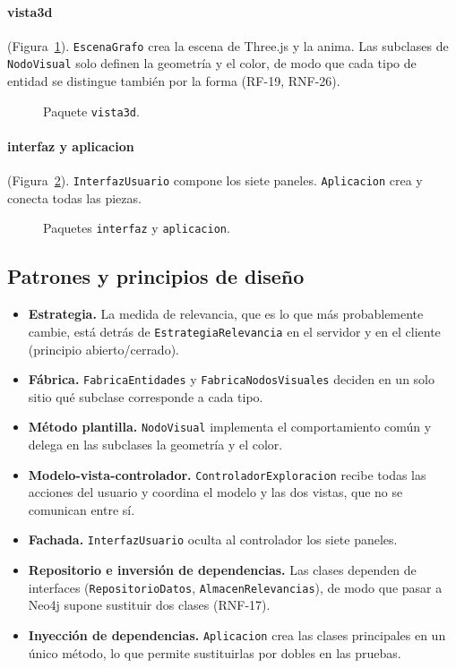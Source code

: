 \paragraph{vista3d} (Figura~\ref{fig:clases-vista3d}). \texttt{EscenaGrafo} crea la escena de Three.js y la anima. Las subclases de \texttt{NodoVisual} solo definen la geometría y el color, de modo que cada tipo de entidad se distingue también por la forma (RF-19, RNF-26).

\begin{figure}[htbp]
  \centering
  \caption{Paquete \texttt{vista3d}.}
  \label{fig:clases-vista3d}
\end{figure}

\paragraph{interfaz y aplicacion} (Figura~\ref{fig:clases-interfaz}). \texttt{InterfazUsuario} compone los siete paneles. \texttt{Aplicacion} crea y conecta todas las piezas.

\begin{figure}[htbp]
  \centering
  \caption{Paquetes \texttt{interfaz} y \texttt{aplicacion}.}
  \label{fig:clases-interfaz}
\end{figure}

\subsection{Patrones y principios de diseño}
\label{sec:patrones}

\begin{itemize}
  \item \textbf{Estrategia.} La medida de relevancia, que es lo que más probablemente cambie, está detrás de \texttt{EstrategiaRelevancia} en el servidor y en el cliente (principio abierto/cerrado).
  \item \textbf{Fábrica.} \texttt{FabricaEntidades} y \texttt{FabricaNodosVisuales} deciden en un solo sitio qué subclase corresponde a cada tipo.
  \item \textbf{Método plantilla.} \texttt{NodoVisual} implementa el comportamiento común y delega en las subclases la geometría y el color.
  \item \textbf{Modelo-vista-controlador.} \texttt{ControladorExploracion} recibe todas las acciones del usuario y coordina el modelo y las dos vistas, que no se comunican entre sí.
  \item \textbf{Fachada.} \texttt{InterfazUsuario} oculta al controlador los siete paneles.
  \item \textbf{Repositorio e inversión de dependencias.} Las clases dependen de interfaces (\texttt{RepositorioDatos}, \texttt{AlmacenRelevancias}), de modo que pasar a Neo4j supone sustituir dos clases (RNF-17).
  \item \textbf{Inyección de dependencias.} \texttt{Aplicacion} crea las clases principales en un único método, lo que permite sustituirlas por dobles en las pruebas.
\end{itemize}

